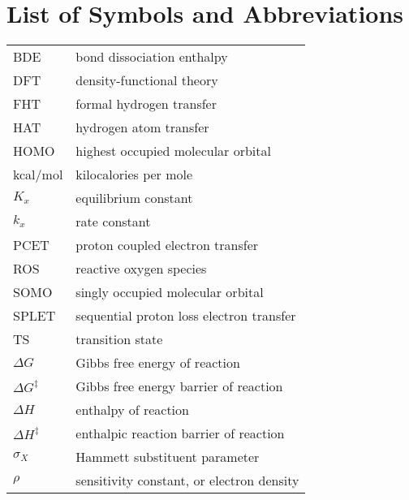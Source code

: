  \label{listofabb}
\chapter{List of Symbols and Abbreviations}

\begin{tabular}{m{3cm} l}
BDE & bond dissociation enthalpy \\
DFT & density-functional theory \\
FHT & formal hydrogen transfer \\
HAT & hydrogen atom transfer \\
HOMO & highest occupied molecular orbital \\
kcal/mol & kilocalories per mole \\
$K_x$ & equilibrium constant \\
$k_x$ & rate constant \\
PCET & proton coupled electron transfer \\
ROS & reactive oxygen species \\
SOMO & singly occupied molecular orbital \\
SPLET & sequential proton loss electron transfer \\
TS & transition state \\
$\Delta G$ & Gibbs free energy of reaction \\
$\Delta G^{\ddagger}$ & Gibbs free energy barrier of reaction \\
$\Delta H$ & enthalpy of reaction \\
$\Delta H^{\ddagger}$ & enthalpic reaction barrier of reaction \\
$\sigma_X$ & Hammett substituent parameter \\
$\rho$ & sensitivity constant, or electron density
\end{tabular}

